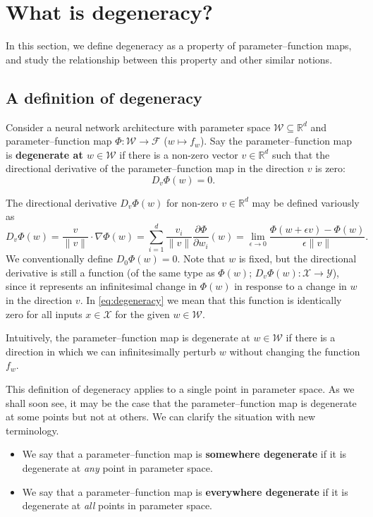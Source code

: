 \documentclass[11pt]{article}
\newcommand{\R}{\mathbb{R}}
\newcommand{\X}{\mathcal{X}}
\newcommand{\Y}{\mathcal{Y}}
\newcommand{\W}{\mathcal{W}}
\newcommand{\F}{\mathcal{F}}
\begin{document}
\clearpage
\section{What is degeneracy?}
\label{sec:degeneracy}

In this section, we define degeneracy as a property of parameter--function maps, and study the relationship between this property and other similar notions.

\subsection{A definition of degeneracy}
\label{sec:degeneracy:definition}

Consider a neural network architecture with parameter space $\W \subseteq \R^d$ and parameter--function map
    $\Phi : \W \to \F$ ($w \mapsto f_w$).
Say the parameter--function map is \textbf{degenerate at $w\in\W$} if there is a non-zero vector $v \in \R^d$ such that the directional derivative of the parameter--function map in the direction $v$ is zero:
\begin{equation}\label{eq:degeneracy}
    D_v \Phi(w) = 0.
\end{equation}

The directional derivative $D_v \Phi(w)$ for non-zero $v \in \R^d$ may be defined variously as
\begin{equation}\label{eq:directional-derivative}
    D_v \Phi(w)
    = \frac{v}{\|v\|} \cdot \nabla \Phi(w)
    = \sum_{i=1}^d \frac{v_i}{\|v\|} \frac{\partial \Phi}{\partial w_i}(w)
    = \lim_{\epsilon \to 0} \frac{\Phi(w + \epsilon v) - \Phi(w)}{\epsilon\|v\|}.
\end{equation}
We conventionally define $D_0 \Phi(w) = 0$.
Note that $w$ is fixed, but the directional derivative is still a function (of
the same type as $\Phi(w)$; $D_v \Phi(w) : \X \to \Y$), since it represents an
infinitesimal change in $\Phi(w)$ in response to a change in $w$ in the
direction $v$. In \eqref{eq:degeneracy} we mean that this function is
identically zero for all inputs $x \in \X$ for the given $w \in \W$.

Intuitively, the parameter--function map is degenerate at $w \in \W$ if there
is a direction in which we can infinitesimally perturb $w$ without changing the
function $f_w$.

This definition of degeneracy applies to a single point in parameter space. As we shall soon see, it may be the case that the parameter--function map is degenerate at some points but not at others. We can clarify the situation with new terminology.
\begin{itemize}
    \item We say that a parameter--function map is \textbf{somewhere degenerate} if it is degenerate at \emph{any} point in parameter space.
    \item We say that a parameter--function map is \textbf{everywhere degenerate} if it is degenerate at \emph{all} points in parameter space.
\end{itemize}
\end{document}
